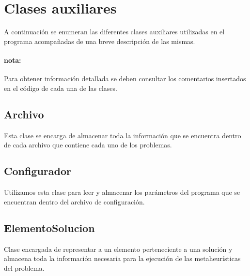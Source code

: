 \documentclass{article}
\begin{document}
	\section{Clases auxiliares}
	
	\paragraph{} A continuación se enumeran las diferentes clases auxiliares utilizadas en el programa acompañadas de una breve descripción de las mismas.
	
	\paragraph{nota:}Para obtener información detallada se deben consultar los comentarios insertados en el código de cada una de las clases.
	
	\subsection{Archivo}
	
	\paragraph{}Esta clase se encarga de almacenar toda la información que se encuentra dentro de cada archivo que contiene cada uno de los problemas.
	
	
	\subsection{Configurador}
	
	\paragraph{}Utilizamos esta clase para leer y almacenar los parámetros del programa que se encuentran dentro del archivo de configuración.
	
	\subsection{ElementoSolucion}
	
	\paragraph{}Clase encargada de representar a un elemento perteneciente a una solución y almacena toda la información necesaria para la ejecución de las metaheurísticas del problema.
	
\end{document}
